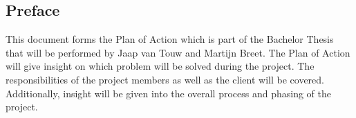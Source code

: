 \subsection*{Preface}
\thispagestyle{fancy}
This document forms the Plan of Action which is part of the Bachelor Thesis that will be performed by Jaap van Touw and Martijn Breet. The Plan of Action will give insight on which problem will be solved during the project. The responsibilities of the project members as well as the client will be covered. Additionally, insight will be given into the overall process and phasing of the project. 